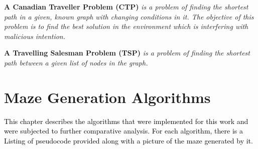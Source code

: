\begin{definition}\textbf{A Canadian Traveller Problem (CTP)} \emph{is a problem of finding the shortest path in a given, known graph with changing conditions in it. The objective of this problem is to find the best solution in the environment which is interfering with malicious intention.}\end{definition}
\begin{definition}\textbf{A Travelling Salesman Problem (TSP)} \emph{is a problem of finding the shortest path between a given list of nodes in the graph.} \end{definition}

\section{Maze Generation Algorithms}
\textcolor{black}{This chapter describes the algorithms that were implemented for this work and were subjected to further comparative analysis. For each algorithm, there is a Listing of pseudocode provided along with a picture of the maze generated by it.}
